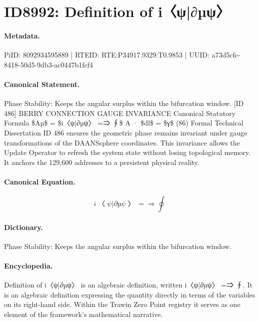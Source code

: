 \section*{ID8992: Definition of i〈ψ|∂µψ〉}
\paragraph{Metadata.}
PiID: 8092934595889 | RTEID: RTE:P34917.9329:T0.9853 | UUID: a73d5cfc-8418-50d5-9db3-ac0447b1fcf4

\paragraph{Canonical Statement.}
Phase Stability: Keeps the angular surplus within the bifurcation window. [ID 486] BERRY CONNECTION GAUGE INVARIANCE Canonical Statutory Formula \$Aµ\$ = \$i〈ψ|∂µψ〉 =⇒ ∮\$ A · \$dl\$ = \$γ\$ (86) Formal Technical Dissertation ID 486 ensures the geometric phase remains invariant under gauge transformations of the DAANSsphere coordinates. This invariance allows the Update Operator to refresh the system state without losing topological memory. It anchors the 129,600 addresses to a persistent physical reality.

\paragraph{Canonical Equation.}
\[
i〈ψ|∂µψ〉 =⇒ ∮
\]

\paragraph{Dictionary.}
Phase Stability: Keeps the angular surplus within the bifurcation window.

\paragraph{Encyclopedia.}
Definition of i〈ψ|∂µψ〉 is an algebraic definition, written i〈ψ|∂µψ〉 =⇒ ∮. It is an algebraic definition expressing the quantity directly in terms of the variables on its right-hand side. Within the Trawin Zero Point registry it serves as one element of the framework's mathematical narrative.
